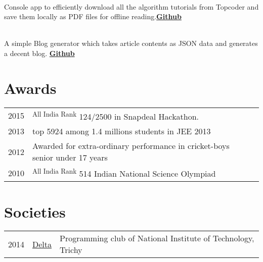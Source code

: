 \documentclass[]{deedy-resume-openfont}
\begin{document}
\begin{minipage}[t]{0.66\textwidth}
\\
Console app to efficiently download all the algorithm tutorials from Topcoder and save them locally as PDF files for offline reading.\textbf{\href{https://github.com/tushar-rishav/topcoder-dl}{Github}}
\sectionsep

\\
A simple Blog generator which takes article contents as JSON data and generates a decent blog.
\textbf{\href{https://github.com/tushar-rishav/Blogular}{Github}}
\sectionsep



\section{Awards} 
\begin{tabular}{rll}
2015     & \textsuperscript{All India Rank} 124/2500 in Snapdeal Hackathon.\\
2013	     & top 5924 among 1.4 millions students in JEE 2013\\
2012     & Awarded for extra-ordinary performance in cricket-boys senior under 17 years\\
2010	     & \textsuperscript{All India Rank} 514 Indian National Science Olympiad\\
\end{tabular}
\sectionsep


\section{Societies} 

\begin{tabular}{rll}
2014   & {\href{https://github.com/delta}{Delta}} & Programming club of National Institute of Technology, Trichy\\
\end{tabular}
\sectionsep

\end{minipage} 
\end{document}
